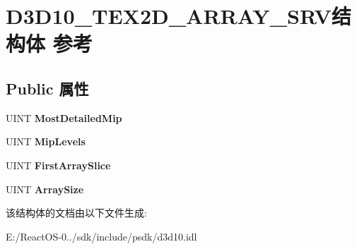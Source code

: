 \hypertarget{struct_d3_d10___t_e_x2_d___a_r_r_a_y___s_r_v}{}\section{D3\+D10\+\_\+\+T\+E\+X2\+D\+\_\+\+A\+R\+R\+A\+Y\+\_\+\+S\+R\+V结构体 参考}
\label{struct_d3_d10___t_e_x2_d___a_r_r_a_y___s_r_v}
\subsection*{Public 属性}
\begin{DoxyCompactItemize}
\item 
\mbox{\label{struct_d3_d10___t_e_x2_d___a_r_r_a_y___s_r_v_a1c42cbe38eab1ab8fa2b21146da260c4}} 
U\+I\+NT {\bfseries Most\+Detailed\+Mip}
\item 
\mbox{\label{struct_d3_d10___t_e_x2_d___a_r_r_a_y___s_r_v_a27f631c9b1cb32b1e3afb2bfdc82eb37}} 
U\+I\+NT {\bfseries Mip\+Levels}
\item 
\mbox{\label{struct_d3_d10___t_e_x2_d___a_r_r_a_y___s_r_v_a25d4fe3be097eeaad6e1a8a325500624}} 
U\+I\+NT {\bfseries First\+Array\+Slice}
\item 
\mbox{\label{struct_d3_d10___t_e_x2_d___a_r_r_a_y___s_r_v_adb8bab48f0c7b3ea4cc84f4def810143}} 
U\+I\+NT {\bfseries Array\+Size}
\end{DoxyCompactItemize}


该结构体的文档由以下文件生成\+:\begin{DoxyCompactItemize}
\item 
E\+:/\+React\+O\+S-\/0../sdk/include/psdk/d3d10.\+idl\end{DoxyCompactItemize}
